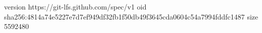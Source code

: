 version https://git-lfs.github.com/spec/v1
oid sha256:4814a74e5227e7d7ef949df32fb1f50db49f3645cda0604c54a7994fddfc1487
size 5592480
